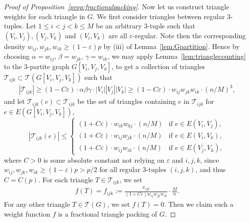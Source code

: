 \documentclass[11pt,reqno]{amsart}
\theoremstyle{definition}
\theoremstyle{remark}
\newcommand\dT{\mathcal{T}}
\renewcommand\leq{\leqslant}
\renewcommand\geq{\geqslant}
\renewcommand\le{\leqslant}
\renewcommand\ge{\geqslant}
\begin{document}
\begin{proof}[Proof of Proposition~\ref{prop:fractionalpacking}]
Now let us construct triangle weights for each triangle in $G$. We first consider triangles between regular $3$-tuples. Let $1\leq i<j<k\leq M$ be an arbitrary 3-tuple such that $(V_i,V_j),(V_j,V_k)$ and $(V_i,V_k)$ are all $\varepsilon$-regular. Note then the corresponding density $w_{ij},w_{jk}, w_{ik}\geq(1-\varepsilon)p$ by (iii) of Lemma~\ref{lem:Gpartition}. Hence by choosing $\alpha=w_{ij}$, $\beta= w_{jk}$, $\gamma=w_{ik}$, we may apply Lemma~\ref{lem:trianglecounting} to the $3$-partite graph $G[V_i,V_j,V_k]$, to get a collection of triangles $\dT_{ijk}\subset \dT(G[V_i,V_j,V_k])$ such that
\begin{align}\label{eq:dTijk}
|\dT_{ijk}|\ge(1-C\varepsilon)\cdot\alpha\beta\gamma\cdot |V_i||V_j||V_k|\geq (1-C\varepsilon)\cdot w_{ij}w_{jk}w_{ik}\cdot(n/M)^3,   
\end{align}
and let $\dT_{ijk}(e)\subset\dT_{ijk}$ be the set of triangles containing $e$ in $\dT_{ijk}$ for $e\in E(G[V_i,V_j,V_k])$,
\begin{equation}\label{eq:Taue'}
|\dT_{ijk}(e)|\le
\begin{cases}
(1+C\varepsilon)\cdot w_{ik}w_{kj}\cdot (n/M) & \text{if } e \in E(V_i,V_j), \\[4pt]
(1+C\varepsilon)\cdot w_{ij}w_{jk}\cdot (n/M) & \text{if } e \in E(V_i,V_k), \\[4pt]
(1+C\varepsilon)\cdot w_{ij}w_{ik}\cdot(n/M) & \text{if } e \in E(V_j,V_k),
\end{cases}
\end{equation}
where $C>0$ is some absolute constant not relying on $\varepsilon$ and $i,j,k$, since $w_{ij},w_{jk}, w_{ik}\geq(1-\varepsilon)p>p/2$ for all regular 3-tuples $(i,j,k)$, and thus $C=C(p)$. For each triangle  $T\in\dT_{ijk}$, we set
\begin{align}\label{eq:fijk}
f(T)=f_{ijk}:=\frac{x_{ijk}}{(1+C\varepsilon)w_{ij}w_{jk}w_{ik}}\cdot\frac{M}{n}.   
\end{align}
For any other triangle $T\in\dT(G)$, we set $f(T)=0$. Then we claim such a weight function $f$ is a fractional triangle packing of $G$.


\end{proof}
\end{document}
